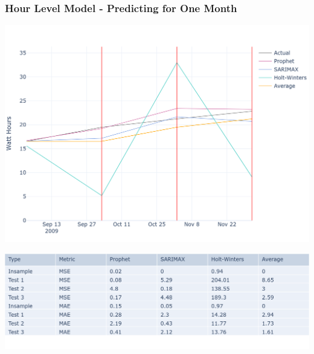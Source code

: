 \documentclass[10pt]{beamer}
\begin{document}
\begin{frame}
\frametitle{Hour Level Model - Predicting for One Month}

\bigskip
{
    \centering
    \includegraphics[width=\textwidth,height=\textheight,keepaspectratio]{model_comparison_timeseries_hourmodel_months.png}
    \par
}
\bigskip

\bigskip
{
    \centering
    \includegraphics[width=\textwidth,height=\textheight,keepaspectratio]{model_comparison_table_hourmodel_months.png}
    \par
}
\bigskip


\end{frame}
\end{document}

